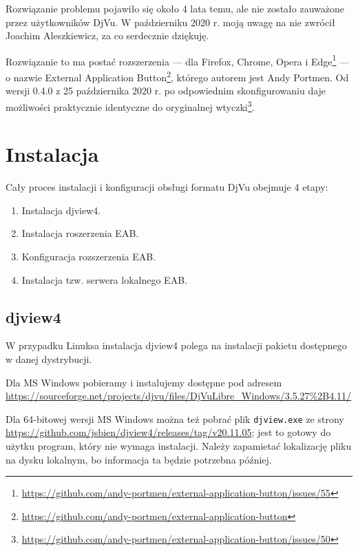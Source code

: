 \documentclass[withmarginpar]{mwart}
\begin{document}
Rozwiązanie problemu pojawiło się około 4 lata temu, ale nie zostało
zauważone przez użytkowników DjVu. W październiku 2020 r. moją uwagę
na nie zwrócił Joachim Aleszkiewicz, za co serdecznie dziękuję.

Rozwiązanie to ma postać rozszerzenia --- dla Firefox, Chrome, Opera i
Edge\footnote{\url{https://github.com/andy-portmen/external-application-button/issues/55}}
--- o nazwie \textsf{External Application
  Button}\footnote{\url{https://github.com/andy-portmen/external-application-button}},
którego autorem jest Andy Portmen. Od wersji 0.4.0 z 25 października
2020 r. po odpowiednim skonfigurowaniu daje możliwości praktycznie
identyczne do oryginalnej
wtyczki\footnote{\url{https://github.com/andy-portmen/external-application-button/issues/50}}.

\section{Instalacja}
\label{sec:instalacja}


Cały proces instalacji i konfiguracji obsługi formatu DjVu obejmuje 4
etapy:

\begin{enumerate}
\item Instalacja \textsf{djview4}.
\item Instalacja roszerzenia EAB.
\item Konfiguracja rozszerzenia EAB.
\item Instalacja tzw. serwera lokalnego EAB.
\end{enumerate}


\subsection{djview4}
\label{sec:djview4}


W przypadku Linuksa instalacja \textsf{djview4} polega na instalacji
pakietu dostępnego w danej dystrybucji.

Dla MS Windows pobieramy i instalujemy
dostępne pod adresem
\url{https://sourceforge.net/projects/djvu/files/DjVuLibre_Windows/3.5.27\%2B4.11/}

Dla 64-bitowej wersji MS Windows można też pobrać plik \texttt{djview.exe} ze strony
\url{https://github.com/jsbien/djview4/releases/tag/v20.11.05}; jest
to gotowy do użytku program, który nie wymaga instalacji. Należy
zapamietać lokalizację pliku na dysku lokalnym, bo informacja ta
będzie potrzebna później.
\end{document}
